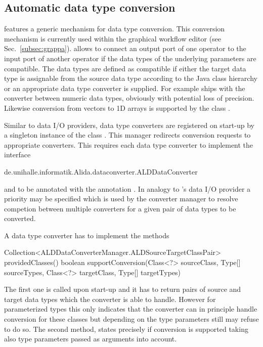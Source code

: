 \subsection{Automatic data type conversion}
\label{subsec:converter}

\alida features a generic mechanism for data type conversion.
This conversion mechanism is currently used within the graphical workflow editor \grappa
(see Sec.~\ref{subsec:grappa}).
\grappa allows to connect an output port of one operator to the input port of another operator
if the data types of the underlying parameters are compatible.
The data types are defined as compatible if either the target data type is
assignable from the source data type according to the Java class hierarchy or
an appropriate data type converter is supplied.
For example \alida ships with the converter 
 between numeric data types, obviously
with potential loss of precision.
Likewise conversion from vectors to 1D arrays is supported
by the class .

Similar to data I/O providers, data type converters are registered on start-up by 
a singleton instance of the class .
This manager redirects conversion requests to appropriate
converters.
This requires each data type converter to implement the interface
\begin{code}
de.unihalle.informatik.Alida.dataconverter.ALDDataConverter
\end{code}
and to be annotated with the \alida annotation
.
In analogy to \alida's data I/O provider a priority may be specified which is used
by the converter manager to resolve competion between multiple converters for a
given pair of data types to be converted.

A data type converter has to implement the methods
\begin{code}
Collection<ALDDataConverterManager.ALDSourceTargetClassPair> providedClasses()
boolean supportConversion(Class<?> sourceClass, Type[] sourceTypes, 
                               Class<?> targetClass, Type[] targetTypes)
\end{code}
The first one is called upon start-up and it has to return pairs of source and
target data types which the converter is able to handle.
However for parameterized types this only indicates that the converter can in principle handle conversion 
for these classes but depending on the type parameters still may refuse to do so.
The second method,  states precisely if conversion is supported
taking also type parameters passed as arguments into account.

